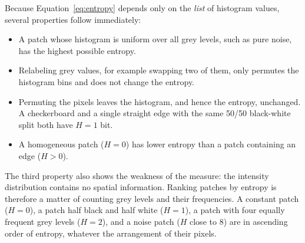 Because Equation~\eqref{eq:entropy} depends only on the \emph{list} of histogram
values, several properties follow immediately:
\begin{itemize}
  \item A patch whose histogram is uniform over all grey levels, such as pure
        noise, has the highest possible entropy.
  \item Relabeling grey values, for example swapping two of them, only permutes
        the histogram bins and does not change the entropy.
  \item Permuting the pixels leaves the histogram, and hence the entropy,
        unchanged. A checkerboard and a single straight edge with the same
        50/50 black-white split both have $H = 1$ bit.
  \item A homogeneous patch ($H=0$) has lower entropy than a patch containing an
        edge ($H>0$).
\end{itemize}
\noindent
The third property also shows the weakness of the measure: the intensity
distribution contains no spatial information. Ranking patches by entropy is
therefore a matter of counting grey levels and their frequencies. A constant
patch ($H=0$), a patch half black and half white ($H=1$), a patch with four
equally frequent grey levels ($H=2$), and a noise patch ($H$ close to $8$) are in
ascending order of entropy, whatever the arrangement of their pixels.

